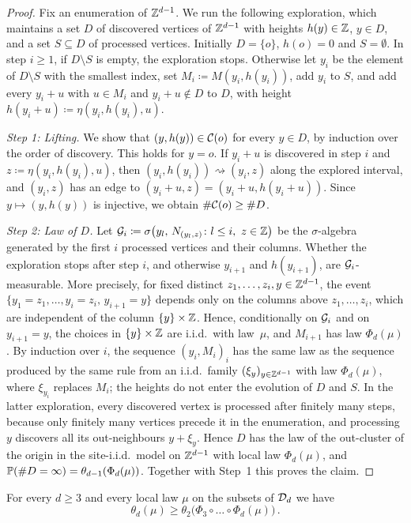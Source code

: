 \documentclass[11pt,letterpaper]{article}
\begin{document}
\begin{proof}
Fix an enumeration of $\Z^{d-1}$. We run the following exploration, which maintains a set $D$ of discovered vertices of $\Z^{d-1}$ with heights $h(y)\in\Z$, $y\in D$, and a set $S\subseteq D$ of processed vertices. Initially $D=\{o\}$, $h(o)=0$ and $S=\emptyset$. In step $i\ge1$, if $D\setminus S$ is empty, the exploration stops. Otherwise let $y_i$ be the element of $D\setminus S$ with the smallest index, set $M_i\coloneqq M(y_i,h(y_i))$, add $y_i$ to $S$, and add every $y_i+u$ with $u\in M_i$ and $y_i+u\notin D$ to $D$, with height $h(y_i+u)\coloneqq\eta(y_i,h(y_i),u)$.

\emph{Step 1: Lifting.} We show that $(y,h(y))\in\cC(o)$ for every $y\in D$, by induction over the order of discovery. This holds for $y=o$. If $y_i+u$ is discovered in step $i$ and $z\coloneqq\eta(y_i,h(y_i),u)$, then $(y_i,h(y_i))\rightsquigarrow(y_i,z)$ along the explored interval, and $(y_i,z)$ has an edge to $(y_i+u,z)=(y_i+u,h(y_i+u))$. Since $y\mapsto(y,h(y))$ is injective, we obtain $\#\cC(o)\ge\#D$.

\emph{Step 2: Law of $D$.} Let $\cG_i\coloneqq\sigma\big(y_l,\,N_{(y_l,z)}\colon l\le i,\ z\in\Z\big)$ be the $\sigma$-algebra generated by the first $i$ processed vertices and their columns. Whether the exploration stops after step $i$, and otherwise $y_{i+1}$ and $h(y_{i+1})$, are $\cG_i$-measurable. More precisely, for fixed distinct $z_1,\dots,z_i,y\in\Z^{d-1}$, the event $\{y_1=z_1,\dots,y_i=z_i,\,y_{i+1}=y\}$ depends only on the columns above $z_1,\dots,z_i$, which are independent of the column $\{y\}\times\Z$. Hence, conditionally on $\cG_i$ and on $y_{i+1}=y$, the choices in $\{y\}\times\Z$ are i.i.d.\ with law~$\mu$, and $M_{i+1}$ has law $\Phi_d(\mu)$. By induction over $i$, the sequence $(y_i,M_i)_i$ has the same law as the sequence produced by the same rule from an i.i.d.\ family $(\xi_y)_{y\in\Z^{d-1}}$ with law $\Phi_d(\mu)$, where $\xi_{y_i}$ replaces $M_i$; the heights do not enter the evolution of $D$ and $S$. In the latter exploration, every discovered vertex is processed after finitely many steps, because only finitely many vertices precede it in the enumeration, and processing $y$ discovers all its out-neighbours $y+\xi_y$. Hence $D$ has the law of the out-cluster of the origin in the site-i.i.d.\ model on $\Z^{d-1}$ with local law $\Phi_d(\mu)$, and $\P(\#D=\infty)=\theta_{d-1}(\Phi_d(\mu))$. Together with Step~1 this proves the claim.
\end{proof}

\begin{corollary}\label{cor:iterate}
For every $d\ge3$ and every local law $\mu$ on the subsets of $\cD_d$ we have
\begin{equation*}
\theta_d(\mu)\ge\theta_2\big(\Phi_3\circ\dots\circ\Phi_d(\mu)\big)\,.
\end{equation*}
\end{corollary}
\end{document}
